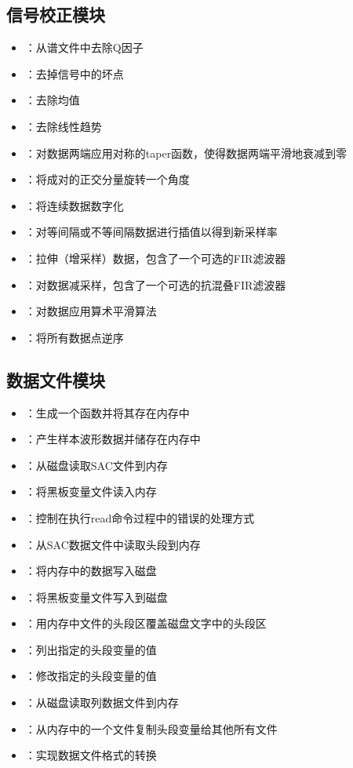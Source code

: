 \subsection*{信号校正模块}
\begin{itemize}
\item {}：从谱文件中去除Q因子
\item {}：去掉信号中的坏点
\item {}：去除均值
\item {}：去除线性趋势
\item {}：对数据两端应用对称的taper函数，使得数据两端平滑地衰减到零
\item {}：将成对的正交分量旋转一个角度
\item {}：将连续数据数字化
\item {}：对等间隔或不等间隔数据进行插值以得到新采样率
\item {}：拉伸（增采样）数据，包含了一个可选的FIR滤波器
\item {}：对数据减采样，包含了一个可选的抗混叠FIR滤波器
\item {}：对数据应用算术平滑算法
\item {}：将所有数据点逆序
\end{itemize}

\subsection*{数据文件模块}
\begin{itemize}
\item {}：生成一个函数并将其存在内存中
\item {}：产生样本波形数据并储存在内存中
\item {}：从磁盘读取SAC文件到内存
\item {}：将黑板变量文件读入内存
\item {}：控制在执行read命令过程中的错误的处理方式
\item {}：从SAC数据文件中读取头段到内存
\item {}：将内存中的数据写入磁盘
\item {}：将黑板变量文件写入到磁盘
\item {}：用内存中文件的头段区覆盖磁盘文字中的头段区
\item {}：列出指定的头段变量的值
\item {}：修改指定的头段变量的值
\item {}：从磁盘读取列数据文件到内存
\item {}：从内存中的一个文件复制头段变量给其他所有文件
\item {}：实现数据文件格式的转换
\end{itemize}

